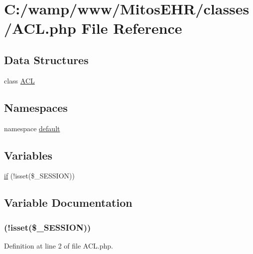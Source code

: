 \hypertarget{_a_c_l_8php}{\section{\-C\-:/wamp/www/\-Mitos\-E\-H\-R/classes/\-A\-C\-L.php \-File \-Reference}
\label{_a_c_l_8php}
}
\subsection*{\-Data \-Structures}
\begin{DoxyCompactItemize}
\item 
class \hyperlink{class_a_c_l}{\-A\-C\-L}
\end{DoxyCompactItemize}
\subsection*{\-Namespaces}
\begin{DoxyCompactItemize}
\item 
namespace \hyperlink{namespacedefault}{default}
\end{DoxyCompactItemize}
\subsection*{\-Variables}
\begin{DoxyCompactItemize}
\item 
\hyperlink{_a_c_l_8php_a8ceca98aa29914fd2479a84a8d2242fb}{if} (!isset(\$\-\_\-\-S\-E\-S\-S\-I\-O\-N))
\end{DoxyCompactItemize}


\subsection{\-Variable \-Documentation}
\hypertarget{_a_c_l_8php_a8ceca98aa29914fd2479a84a8d2242fb}{
\subsubsection[{if}]{(!isset(\$\-\_\-\-S\-E\-S\-S\-I\-O\-N))}}\label{_a_c_l_8php_a8ceca98aa29914fd2479a84a8d2242fb}


\-Definition at line 2 of file \-A\-C\-L.\-php.

